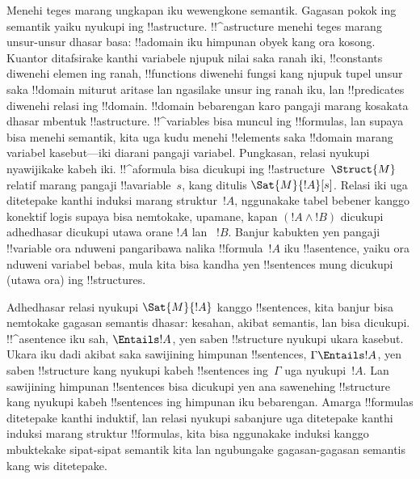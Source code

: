 \documentclass[../../../include/open-logic-section]{subfiles}
\begin{document}


Menehi teges marang ungkapan iku wewengkone semantik. Gagasan pokok
ing semantik yaiku nyukupi ing !!a{structure}. !!^a{structure} menehi
teges marang unsur-unsur dhasar basa: !!a{domain} iku himpunan obyek
kang ora kosong. Kuantor ditafsirake kanthi variabele njupuk nilai saka ranah iki,
!!{constant}s diwenehi elemen ing ranah, !!{function}s diwenehi
fungsi kang njupuk tupel unsur saka !!{domain} miturut aritase lan ngasilake unsur ing ranah iku, lan !!{predicate}s diwenehi
relasi ing !!{domain}. !!{domain} bebarengan karo pangaji marang
kosakata dhasar mbentuk !!a{structure}. !!^{variable}s bisa muncul
ing !!{formula}s, lan supaya bisa menehi semantik, kita uga kudu
menehi !!{element}s saka !!{domain} marang variabel kasebut---iki
diarani pangaji variabel. Pungkasan, relasi nyukupi nyawijikake
kabeh iki. !!^a{formula} bisa dicukupi ing !!a{structure}~$\Struct{M}$
relatif marang pangaji !!a{variable}~$s$, kang ditulis
$\Sat{M}{!A}[s]$. Relasi iki uga ditetepake kanthi induksi marang
struktur~$!A$, nggunakake tabel bebener kanggo konektif logis
supaya bisa nemtokake, upamane, kapan $(!A \land !B)$ dicukupi
adhedhasar dicukupi utawa orane $!A$ lan ~$!B$. Banjur kabukten
yen pangaji !!{variable} ora nduweni pangaribawa nalika
!!{formula}~$!A$ iku !!a{sentence}, yaiku ora nduweni variabel bebas,
mula kita bisa kandha yen !!{sentence}s mung dicukupi (utawa ora)
ing !!{structure}s.

Adhedhasar relasi nyukupi $\Sat{M}{!A}$ kanggo !!{sentence}s, kita
banjur bisa nemtokake gagasan semantis dhasar: kesahan, akibat
semantis, lan bisa dicukupi. !!^a{sentence} iku sah, $\Entails !A$,
yen saben !!{structure} nyukupi ukara kasebut. Ukara iku dadi akibat
saka sawijining himpunan !!{sentence}s, $\Gamma \Entails !A$,
yen saben !!{structure} kang nyukupi kabeh !!{sentence}s ing~$\Gamma$
uga nyukupi~$!A$. Lan sawijining himpunan !!{sentence}s bisa
dicukupi yen ana sawenehing !!{structure} kang nyukupi kabeh
!!{sentence}s ing himpunan iku bebarengan. Amarga !!{formula}s
ditetepake kanthi induktif, lan relasi nyukupi sabanjure uga
ditetepake kanthi induksi marang struktur !!{formula}s, kita
bisa nggunakake induksi kanggo mbuktekake sipat-sipat semantik
kita lan ngubungake gagasan-gagasan semantis kang wis ditetepake.
\end{document}
